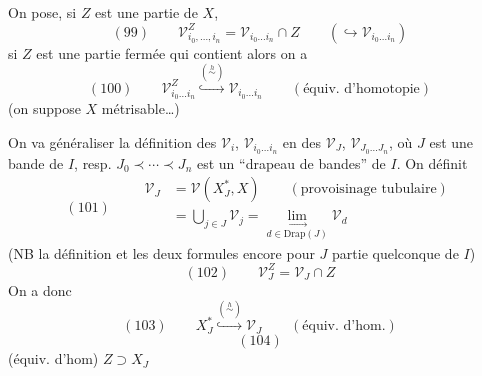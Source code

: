 
On pose, si $Z$ est une partie de $X$,
\[(99)\qquad\mathcal V_{i_0,\ldots,i_n}^{Z}=\mathcal V_{i_0\ldots i_n}\cap Z\qquad(\hookrightarrow\mathcal V_{i_0\ldots i_n})\]
si $Z$ est  une partie  fermée qui contient 
\deleted{\[X_{i_n}-\dot X_{i_0}\qquad(\mathrm{NB}\ \dot X_{i_0}\overset{\mathrm{déf}}=X_{i_0}\setminus X_{i_0}^*=\bigcup_{i<i_0}X_i=\bigcup_{i<i_0}X_i^*)\]}
alors on a
\[(100)\qquad\mathcal V_{i_0\ldots i_n}^{Z}\overset{(\overset h\sim)}{\hookrightarrow}\mathcal V_{i_0\ldots i_n}\qquad(\text{équiv. d'homotopie})\]
(on suppose $X$ métrisable\ldots)

On va généraliser la définition des $\mathcal V_i$, $\mathcal V_{i_0\ldots i_n}$ en des $\mathcal V_J$, $\mathcal V_{J_0\ldots J_n}$, où $J$ est une bande de $I$, resp. $J_0\prec\cdots\prec J_n$ est un ``drapeau de bandes'' de $I$. On définit
\[
(101)\qquad\begin{aligned}
\mathcal V_J&=\mathcal V(X_J^*,X)\qquad(\text{provoisinage tubulaire})\\
&=\bigcup_{j\in J}\mathcal V_j=\underset{d\in\mathrm{Drap}(J)}{\lim_{\longrightarrow}}\mathcal V_d
\end{aligned}
\]
(NB la définition et les deux formules  encore pour $J$ partie quelconque de $I$)
\[(102)\qquad\mathcal V_J^Z=\mathcal V_J\cap Z\]
On a donc
\[(103)\qquad X_J^*\overset{(\overset h\sim)}{\hookrightarrow}\mathcal V_J\qquad(\text{équiv. d'hom.})\]
\[(104)\]
(équiv. d'hom)  $Z\supset X_J$
